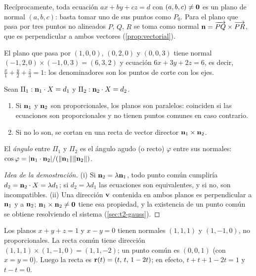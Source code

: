 Recíprocamente, toda ecuación $ax+by+cz=d$ con $(a,b,c)\neq\mathbf{0}$ es un plano de normal $(a,b,c)$: basta tomar uno de sus puntos como $P_0$. Para el plano que pasa por tres puntos no alineados $P$, $Q$, $R$ se toma como normal $\mathbf{n}=\overrightarrow{PQ}\times\overrightarrow{PR}$, que es perpendicular a ambos vectores (\cref{prop:vectorial}).

\begin{ejemplo}\label{ej:t2-plano}
El plano que pasa por $(1,0,0)$, $(0,2,0)$ y $(0,0,3)$ tiene normal $(-1,2,0)\times(-1,0,3)=(6,3,2)$ y ecuación $6x+3y+2z=6$, es decir, $\frac x1+\frac y2+\frac z3=1$: los denominadores son los puntos de corte con los ejes.
\end{ejemplo}

\begin{proposicion}\label{prop:dos-planos}
Sean $\Pi_1:\mathbf{n}_1\cdot X=d_1$ y $\Pi_2:\mathbf{n}_2\cdot X=d_2$.
\begin{enumerate}
  \item Si $\mathbf{n}_1$ y $\mathbf{n}_2$ son proporcionales, los planos son paralelos: coinciden si las ecuaciones son proporcionales y no tienen puntos comunes en caso contrario.
  \item Si no lo son, se cortan en una recta de vector director $\mathbf{n}_1\times\mathbf{n}_2$.
\end{enumerate}
El \emph{ángulo} entre $\Pi_1$ y $\Pi_2$ es el ángulo agudo (o recto) $\varphi$ entre sus normales: $\cos\varphi=\lvert\mathbf{n}_1\cdot\mathbf{n}_2\rvert/(\lVert\mathbf{n}_1\rVert\lVert\mathbf{n}_2\rVert)$.
\end{proposicion}

\begin{proof}[Idea de la demostración]
(i) Si $\mathbf{n}_2=\lambda\mathbf{n}_1$, todo punto común cumpliría $d_2=\mathbf{n}_2\cdot X=\lambda d_1$; si $d_2=\lambda d_1$ las ecuaciones son equivalentes, y si no, son incompatibles. (ii) Una dirección $\mathbf{v}$ contenida en ambos planos es perpendicular a $\mathbf{n}_1$ y a $\mathbf{n}_2$; $\mathbf{n}_1\times\mathbf{n}_2\neq\mathbf{0}$ tiene esa propiedad, y la existencia de un punto común se obtiene resolviendo el sistema (\cref{sec:t2-gauss}).
\end{proof}

\begin{ejemplo}\label{ej:t2-recta-interseccion}
Los planos $x+y+z=1$ y $x-y=0$ tienen normales $(1,1,1)$ y $(1,-1,0)$, no proporcionales. La recta común tiene dirección $(1,1,1)\times(1,-1,0)=(1,1,-2)$; un punto común es $(0,0,1)$ (con $x=y=0$). Luego la recta es $\mathbf{r}(t)=(t,\,t,\,1-2t)$; en efecto, $t+t+1-2t=1$ y $t-t=0$.
\end{ejemplo}


